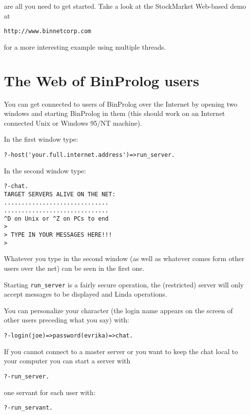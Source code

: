 \documentclass{article}
\begin{document}
are all you need to get started.
Take a look at the StockMarket Web-based demo at
\begin{verbatim}
http://www.binnetcorp.com 
\end{verbatim}

for a more interesting example using multiple threads.


\section{The Web of BinProlog users}

You can get connected to users of BinProlog over the Internet
by opening two windows and starting BinProlog in them
(this should work on an Internet connected Unix or Windows 95/NT
machine).

In the first window type:

\begin{verbatim}
?-host('your.full.internet.address')=>run_server.
\end{verbatim}

In the second window type:

\begin{verbatim}
?-chat.
TARGET SERVERS ALIVE ON THE NET:
..............................
..............................
^D on Unix or ^Z on PCs to end
>
> TYPE IN YOUR MESSAGES HERE!!!
>
\end{verbatim}

Whatever you type in the second window (as well as whatever comes
form other users over the net) can be seen in the first one.

Starting {\tt run\_server} is a fairly secure operation, the (restricted)
server will only accept messages to be displayed and Linda operations.

You can personalize your character (the login name appears
on the screen of other users preceding what you say) with:

\begin{verbatim}
?-login(joe)=>password(evrika)=>chat.
\end{verbatim}

If you cannot connect to a master server or you want to keep
the chat local to your computer you can start a server with
\begin{verbatim}
?-run_server.
\end{verbatim}

\noindent one servant for each user with:
\begin{verbatim}
?-run_servant.
\end{verbatim}
\end{document}
